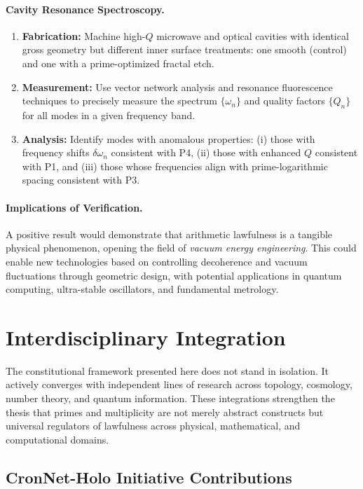 \documentclass[12]{amsart}
\theoremstyle{plain}
\begin{document}
\paragraph{Cavity Resonance Spectroscopy.}
\begin{enumerate}
    \item \textbf{Fabrication:} Machine high-$Q$ microwave and optical cavities with identical gross geometry but different inner surface treatments: one smooth (control) and one with a prime-optimized fractal etch.
    \item \textbf{Measurement:} Use vector network analysis and resonance fluorescence techniques to precisely measure the spectrum $\{\omega_n\}$ and quality factors $\{Q_n\}$ for all modes in a given frequency band.
    \item \textbf{Analysis:} Identify modes with anomalous properties: (i) those with frequency shifts $\delta\omega_n$ consistent with P4, (ii) those with enhanced $Q$ consistent with P1, and (iii) those whose frequencies align with prime-logarithmic spacing consistent with P3.
\end{enumerate}

\paragraph{Implications of Verification.}
A positive result would demonstrate that arithmetic lawfulness is a tangible physical phenomenon, opening the field of \emph{vacuum energy engineering}. This could enable new technologies based on controlling decoherence and vacuum fluctuations through geometric design, with potential applications in quantum computing, ultra-stable oscillators, and fundamental metrology.
\section{Interdisciplinary Integration}

The constitutional framework presented here does not stand in isolation. 
It actively converges with independent lines of research across topology, cosmology, number theory, and quantum information. 
These integrations strengthen the thesis that primes and multiplicity are not merely abstract constructs but universal regulators of lawfulness across physical, mathematical, and computational domains. 

\subsection{CronNet-Holo Initiative Contributions}
\end{document}
